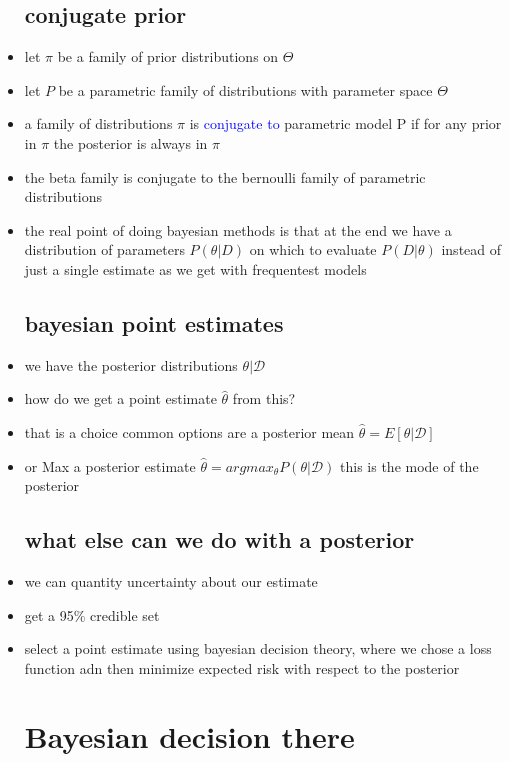 \documentclass{article}
\begin{document}
\begin{itemize}
\subsection*{conjugate prior}
\item let $\pi$ be a family of prior distributions on $\Theta$
\item let $P$ be a parametric family of distributions with parameter space $\Theta$
\item a family of distributions $\pi$ is  \textcolor{blue}{conjugate to} parametric model P if for any prior in  $\pi$ the posterior is always in $\pi$
\item the beta family is conjugate to the bernoulli family of parametric distributions
\item the real point of doing bayesian methods is that at the end we have a distribution of parameters $P(\theta|D)$ on which to evaluate $P(D|\theta)$ instead of just a single estimate as we get with frequentest models
\subsection*{bayesian point estimates}
\item we have the posterior distributions $\theta|\mathcal{D}$
\item how do we get a point estimate $\hat{\theta}$ from this? 
\item that is a choice common options are a posterior mean $\hat{\theta}=E[\theta|\mathcal{D}]$ 
\item or Max a posterior estimate $\hat{\theta}=argmax_{\theta}P(\theta|\mathcal{D})$ this is the mode of the posterior
\subsection*{what else can we do with a posterior}
\item we can quantity uncertainty about our estimate
\item get a 95\% credible set 
\item select a point estimate using bayesian decision theory, where we chose a loss function adn then minimize expected risk with respect to the posterior
\section*{Bayesian decision there}

\end{itemize}
\end{document}
